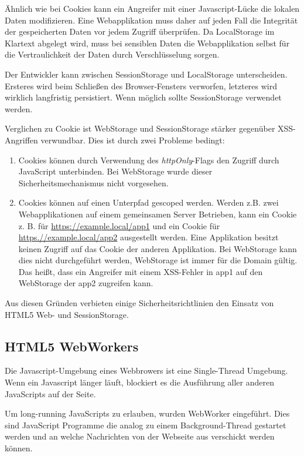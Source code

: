 Ähnlich wie bei Cookies kann ein Angreifer mit einer Javascript-Lücke die lokalen Daten modifizieren. Eine Webapplikation muss daher auf jeden Fall die Integrität der gespeicherten Daten vor jedem Zugriff überprüfen. Da LocalStorage im Klartext abgelegt wird, muss bei sensiblen Daten die Webapplikation selbst für die Vertraulichkeit der Daten durch Verschlüsselung sorgen.

Der Entwickler kann zwischen SessionStorage und LocalStorage unterscheiden. Ersteres wird beim Schließen des Browser-Fensters verworfen, letzteres wird wirklich langfristig persistiert. Wenn möglich sollte SessionStorage verwendet werden.

Verglichen zu Cookie ist WebStorage und SessionStorage stärker gegenüber XSS-Angriffen verwundbar. Dies ist durch zwei Probleme bedingt:

\begin{enumerate}
\item Cookies können durch Verwendung des \textit{httpOnly}-Flags den Zugriff durch JavaScript unterbinden. Bei WebStorage wurde dieser Sicherheitsmechanismus nicht vorgesehen.
\item Cookies können auf einen Unterpfad gescoped werden. Werden z.B. zwei Webapplikationen auf einem gemeinsamen Server Betrieben, kann ein Cookie z. B. für \url{https://example.local/app1} und ein Cookie für \url{https.//example.local/app2} ausgestellt werden. Eine Applikation besitzt keinen Zugriff auf das Cookie der anderen Applikation. Bei WebStorage kann dies nicht durchgeführt werden, WebStorage ist immer für die Domain gültig. Das heißt, dass ein Angreifer mit einem XSS-Fehler in app1 auf den WebStorage der app2 zugreifen kann.
\end{enumerate}

Aus diesen Gründen verbieten einige Sicherheitsrichtlinien den Einsatz von HTML5 Web- und SessionStorage.

\subsection{HTML5 WebWorkers}

Die Javascript-Umgebung eines Webbrowers ist eine Single-Thread Umgebung. Wenn ein Javascript länger läuft, blockiert es die Ausführung aller anderen JavaScripts auf der Seite.

Um long-running JavaScripts zu erlauben, wurden WebWorker eingeführt. Dies sind JavaScript Programme die analog zu einem Background-Thread gestartet werden und an welche Nachrichten von der Webseite aus verschickt werden können.

